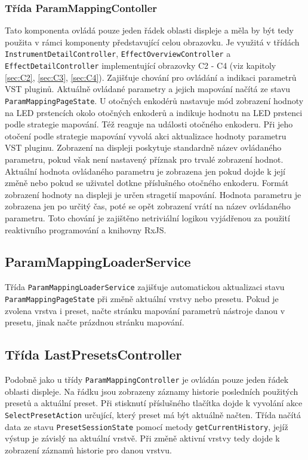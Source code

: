 \documentclass[thesis=M,czech]{FITthesis}[2019/03/06]
\begin{document}
			\subsubsection{Třída ParamMappingContoller}
				Tato komponenta ovládá pouze jeden řádek oblasti displeje a měla by být tedy použita v rámci komponenty představující celou obrazovku.
				Je využitá v třídách \texttt{InstrumentDetailController}, \texttt{EffectOverviewController} a \texttt{EffectDetailController} implementující obrazovky C2 - C4 (viz kapitoly \ref{sec:C2}, \ref{sec:C3}, \ref{sec:C4}). Zajišťuje chování pro ovládání a indikaci parametrů VST pluginů. Aktuálně ovládané parametry a jejich mapování načítá ze stavu \texttt{ParamMappingPageState}.
				U otočných enkodérů nastavuje mód zobrazení hodnoty na LED prstencích okolo otočných enkoderů a indikuje hodnotu na LED prstenci podle strategie mapování. Též
				reaguje na události otočného enkoderu. Při jeho otočení podle strategie mapování vyvolá akci aktualizace hodnoty parametru VST pluginu.
				Zobrazení na displeji poskytuje standardně název ovládaného parametru, pokud však není nastavený příznak pro trvalé 
				zobrazení hodnot.
				Aktuální hodnota ovládaného parametru je zobrazena jen pokud dojde k její změně nebo pokud se uživatel dotkne příslušného otočného enkoderu.
				Formát zobrazení hodnoty na displeji je určen stragetií mapování.
				Hodnota parametru je zobrazena jen po určitý čas, poté se opět zobrazení vrátí na název ovládaného parametru. 
				Toto chování je zajištěno netriviální logikou vyjádřenou za použití reaktivního programování a knihovny RxJS.

			\subsection{ParamMappingLoaderService}
				Třída \texttt{ParamMappingLoaderService} zajišťuje automatickou aktualizaci stavu \texttt{ParamMappingPageState} při změně aktuální vrstvy nebo presetu.
				Pokud je zvolena vrstva i preset, načte stránku mapování parametrů nástroje danou v presetu, jinak načte prázdnou stránku mapování.
				
			\subsection{Třída LastPresetsController}
				Podobně jako u třídy \texttt{ParamMappingController} je ovládán pouze jeden řádek oblasti displeje. Na řádku jsou zobrazeny
				záznamy historie posledních použitých presetů a aktuální preset. Při stisknutí příslušného tlačítka dojde k vyvolání 
				akce \texttt{SelectPresetAction} určující, který preset má být aktuálně načten. Třída načítá data ze stavu \texttt{PresetSessionState}
				pomocí metody \texttt{getCurrentHistory}, jejíž výstup je závislý na aktuální vrstvě. Při změně aktivní vrstvy tedy dojde
				k zobrazení záznamů historie pro danou vrstvu.
							
\end{document}
